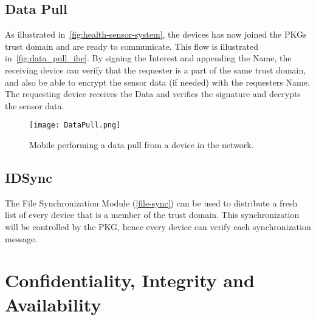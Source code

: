 

\subsection{Data Pull}\label{data_pull}
As illustrated in~\autoref{fig:health-sensor-system}, the devices has now joined the \gls{PKG}s trust domain and are ready to communicate.
This flow is illustrated in~\autoref{fig:data_pull_ibe}.
By signing the Interest and appending the Name, the receiving device can verify that the requester is a part of the same trust domain, and also be able to encrypt the sensor data (if needed) with the requesters Name.
The requesting device receives the Data and verifies the signature and decrypts the sensor data.

\begin{figure}[ht]
  \centering
  \texttt{[image: DataPull.png]}
  \caption{Mobile performing a data pull from a device in the network.}
  \label{fig:data_pull_ibe}
\end{figure}

\subsection{IDSync}
The File Synchronization Module (\autoref{file-sync}) can be used to distribute a fresh list of every device that is a member of the trust domain.
This synchronization will be controlled by the \gls{PKG}, hence every device can verify each synchronization message.

\section{Confidentiality, Integrity and Availability}


